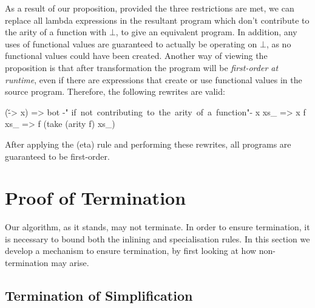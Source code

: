 \documentclass{sigplanconf}
\begin{document}
As a result of our proposition, provided the three restrictions are met, we can replace all lambda expressions in the resultant program which don't contribute to the arity of a function with $\bot{}$, to give an equivalent program. In addition, any uses of functional values are guaranteed to actually be operating on $\bot{}$, as no functional values could have been created. Another way of viewing the proposition is that after transformation the program will be \textit{first-order at runtime}, even if there are expressions that create or use functional values in the source program. Therefore, the following rewrites are valid:

\ignore\begin{code}
(\v -> x)  => bot    {-"\hspace{3mm} \hbox{if not contributing to the arity of a function}"-}
x xs_      => x
f xs_      => f (take (arity f) xs_)
\end{code}

After applying the (eta) rule and performing these rewrites, all programs are guaranteed to be first-order.

\section{Proof of Termination}
\label{sec:termination}

\begin{comment}
We can remove all data types by encoding them as functions, as described in \citet{naylor:reduceron}. If we then had a transformation which made the program first-order \textit{without} introducing any data types, we would end up with a program without data or closures, which is incapable of storing an unbounded amount of information. Since with higher-order functions we can implement a Turing machine \cite{turing:halting}, and without an unbounded store we cannot, such a transformation cannot exist.
\end{comment}

Our algorithm, as it stands, may not terminate. In order to ensure termination, it is necessary to bound both the inlining and specialisation rules. In this section we develop a mechanism to ensure termination, by first looking at how non-termination may arise.

\subsection{Termination of Simplification}
\label{sec:termination_simplification}
\end{document}
